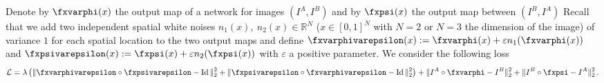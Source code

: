 Denote by $\fxvarphi(x)$ the output map of a network for images $(I^A,I^B)$ and by $\fxpsi(x)$ the output map between $(I^B,I^A)$
Recall that we add two independent spatial white noises $n_1(x),~n_2(x)\in\mathbb{R}^N$ ($x \in [0,1]^N$ with $N = 2$ or $N = 3$ the dimension of the image)
of variance $1$ for each spatial location to the two output maps and define $\fxvarphivarepsilon(x) := \fxvarphi(x) + \varepsilon n_1(\fxvarphi(x))$ and $\fxpsivarepsilon(x) := \fxpsi(x) + \varepsilon n_2(\fxpsi(x))$ with $\varepsilon$ a positive parameter.
We consider the following loss
\begin{multline}\label{EqLossSymmetric2}
    \mathcal{L} =\lambda \left( \| \fxvarphivarepsilon \circ \fxpsivarepsilon - \operatorname{Id} \|^2_2 + \| \fxpsivarepsilon \circ \fxvarphivarepsilon - \operatorname{Id} \|^2_2 \right) + \| I^A \circ \fxvarphi - I^B \|^2_2 + \| I^B \circ \fxpsi  - I^A \|^2_2\,.
\end{multline}
%
%
%
